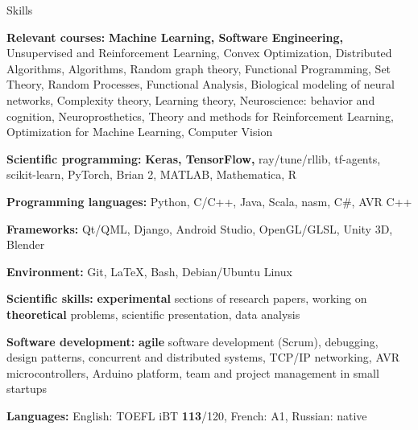 \documentclass{resume} %
\begin{document}
\begin{rSection}{Skills}
	\vspace{-1em}
	\item {\color{grayheading}\bf Relevant courses:} {\bf Machine Learning, Software Engineering,} {\small Unsupervised and Reinforcement Learning, Convex Optimization, Distributed Algorithms, Algorithms, Random graph theory, Functional Programming, Set Theory, Random Processes, Functional Analysis, Biological modeling of neural networks, Complexity theory, Learning theory, Neuroscience: behavior and cognition, Neuroprosthetics, Theory and methods for Reinforcement Learning, Optimization for Machine Learning, Computer Vision}
	\item {\color{grayheading}\bf Scientific programming:} {\bf Keras, TensorFlow,} ray/tune/rllib, tf-agents, scikit-learn, PyTorch, Brian 2, MATLAB, Mathematica, R
	\item {\color{grayheading}\bf Programming languages:} Python, C/C++, Java, {\small Scala, nasm, C\#, AVR C++}
	\item {\color{grayheading}\bf Frameworks:} Qt/QML, Django, {\small Android Studio, OpenGL/GLSL, Unity 3D, Blender}
	\item {\color{grayheading}\bf Environment:} Git, \LaTeX, Bash, Debian/Ubuntu Linux
	\item {\color{grayheading}\bf Scientific skills:} {\bf experimental} sections of research papers, working on {\bf theoretical} problems, scientific presentation, data analysis
	\item {\color{grayheading}\bf Software development:} {\bf agile} software development (Scrum), debugging, design patterns, concurrent and distributed systems, {\small TCP/IP networking, AVR microcontrollers, Arduino platform, team and project management in small startups}
	\item {\color{grayheading}\bf Languages:} English: TOEFL iBT {\bf 113}/120, {\small French: A1, Russian: native}
\end{rSection}
\end{document}
